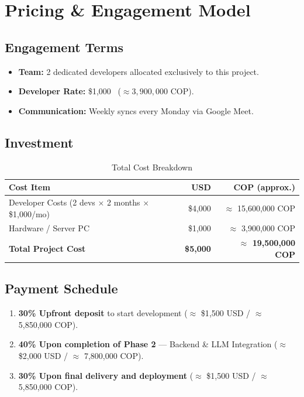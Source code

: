 \documentclass[11pt, a4paper]{article}
\begin{document}
\section{Pricing \& Engagement Model}

\subsection*{Engagement Terms}

\begin{itemize}
  \item \textbf{Team:} 2 dedicated developers allocated exclusively to this project.
  \item \textbf{Developer Rate:} \$1{,}000\ 
    ($\approx 3{,}900{,}000$ COP).
  \item \textbf{Communication:} Weekly syncs every Monday via Google Meet.
\end{itemize}

\subsection*{Investment}

\begin{table}[H]
  \centering
  \caption{Total Cost Breakdown}
  \label{tab:cost}
  \renewcommand{\arraystretch}{1.3}
  \begin{tabular}{l r r}
    \toprule
    \textbf{Cost Item} & \textbf{USD} & \textbf{COP (approx.)} \\
    \midrule
    Developer Costs (2 devs $\times$ 2 months $\times$
    \$1{,}000/mo) & \$4{,}000 & $\approx$ 15{,}600{,}000 COP \\
    Hardware / Server PC & \$1{,}000 & $\approx$ 3{,}900{,}000 COP \\
    \midrule
    \textbf{Total Project Cost} & \textbf{\$5{,}000} & \textbf{$\approx$
    19{,}500{,}000 COP} \\
    \bottomrule
  \end{tabular}
\end{table}

\subsection*{Payment Schedule}

\begin{enumerate}
  \item \textbf{30\% Upfront deposit} to start development
    ($\approx$ \$1{,}500 USD / $\approx$ 5{,}850{,}000 COP).

  \item \textbf{40\% Upon completion of Phase 2} --- Backend \& LLM Integration
    ($\approx$ \$2{,}000 USD / $\approx$ 7{,}800{,}000 COP).

  \item \textbf{30\% Upon final delivery and deployment}
    ($\approx$ \$1{,}500 USD / $\approx$ 5{,}850{,}000 COP).
\end{enumerate}
\end{document}
